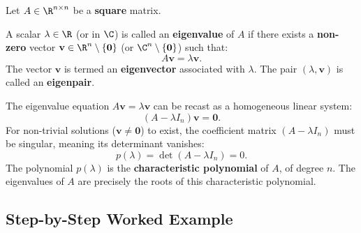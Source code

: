 Let $A \in \R^{n \times n}$ be a \textbf{square} matrix.

\begin{definition}
\label{def:eigenvalue-eigenvector}
A scalar $\lambda \in \R$ (or in $\C$) is called an \textbf{eigenvalue} of $A$ if there exists a \textbf{non-zero} vector $\mathbf{v} \in \R^n \setminus \{\mathbf{0}\}$ (or $\C^n \setminus \{\mathbf{0}\}$) such that:
\begin{equation}
    A\mathbf{v} = \lambda \mathbf{v}.
\end{equation}
The vector $\mathbf{v}$ is termed an \textbf{eigenvector} associated with $\lambda$. The pair $(\lambda, \mathbf{v})$ is called an \textbf{eigenpair}.
\end{definition}

The eigenvalue equation $A\mathbf{v} = \lambda \mathbf{v}$ can be recast as a homogeneous linear system:
\begin{equation}
    (A - \lambda I_n)\mathbf{v} = \mathbf{0}.
\end{equation}
For non-trivial solutions ($\mathbf{v} \neq \mathbf{0}$) to exist, the coefficient matrix $(A - \lambda I_n)$ must be singular, meaning its determinant vanishes:
\begin{equation}
    p(\lambda) = \det(A - \lambda I_n) = 0.
\end{equation}
The polynomial $p(\lambda)$ is the \textbf{characteristic polynomial} of $A$, of degree $n$. The eigenvalues of $A$ are precisely the roots of this characteristic polynomial.

\subsection{Step-by-Step Worked Example}

